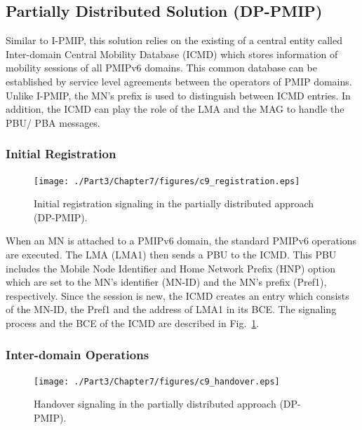 \subsection{Partially Distributed Solution (DP-PMIP)}

Similar to I-PMIP, this solution relies on the existing of a central entity called Inter-domain Central Mobility Database (ICMD) which stores information of mobility sessions of all PMIPv6 domains. This common database can be established by service level agreements between the operators of PMIP domains. Unlike I-PMIP, the MN's prefix is used to distinguish between ICMD entries. In addition, the ICMD can play the role of the LMA and the MAG to handle the PBU/ PBA messages. 
\subsubsection{Initial Registration}
\begin{figure}[h!]
\centering
\texttt{[image: ./Part3/Chapter7/figures/c9\_registration.eps]}
\caption[Initial registration signaling in the partially distributed approach.]{Initial registration signaling in the partially distributed approach (DP-PMIP).}
\label{fig:c9_registration}
\end{figure}

When an MN is attached to a PMIPv6 domain, the standard PMIPv6 operations are executed. The LMA (LMA1) then sends a PBU to the ICMD. This PBU includes the Mobile Node Identifier and Home Network Prefix (HNP) option which are set to the MN's identifier (MN-ID) and the MN's prefix (Pref1), respectively. Since the session is new, the ICMD creates an entry which consists of the MN-ID, the Pref1 and the address of LMA1 in its BCE. The signaling process and the BCE of the ICMD are described in Fig.~\ref{fig:c9_registration}.
\subsubsection{Inter-domain Operations}
\begin{figure}[h!]
\centering
\texttt{[image: ./Part3/Chapter7/figures/c9\_handover.eps]}
\caption[Handover signaling in the partially distributed approach.]{Handover signaling in the partially distributed approach (DP-PMIP).}
\label{fig:c9_handover}
\end{figure}

